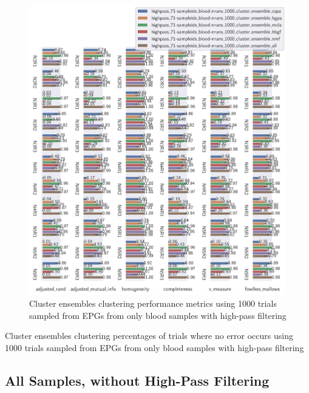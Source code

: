 \begin{theappendices}
\begin{figure}[htbp]
\centering
\includegraphics[width=\textwidth]{./figures/clust_comparison/highpass_71-sampleids_blood-nruns_1000_cluster_ensembles.pdf}
\caption{Cluster ensembles clustering performance metrics using 1000 trials sampled from EPGs from only blood samples with high-pass filtering}
\label{appendix:fig:highpass_71-sampleids_blood-nruns_1000_cluster_ensembles}
\end{figure}

\begin{table}[htbp]
\centering
{}
\caption{Cluster ensembles clustering percentages of trials where no error occurs using 1000 trials sampled from EPGs from only blood samples with high-pass filtering}
\label{appendix:table:highpass_71-sampleids_blood-nruns_1000_cluster_ensembles}
\end{table}

\FloatBarrier
\subsection{All Samples, without High-Pass Filtering}


\end{theappendices}
